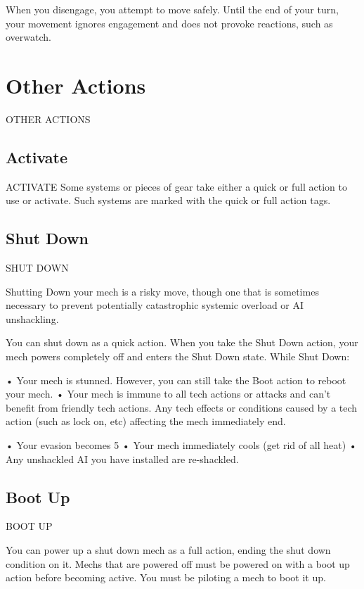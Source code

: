 When you disengage, you attempt to move safely. Until the end of your turn, your movement  
ignores engagement and does not provoke reactions, such as overwatch.
 
\section{Other Actions} OTHER ACTIONS  
\subsection{Activate}
                                             ACTIVATE  
Some systems or pieces of gear take either a quick or full action to use or activate. Such  
systems are marked with the quick or full action tags.
 
\subsection{Shut Down}
                                           SHUT DOWN  

Shutting Down your mech is a risky move, though one that is sometimes necessary to prevent  
potentially catastrophic systemic overload or AI unshackling.   

You can shut down as a quick action. When you take the Shut Down action, your mech powers  
completely off and enters the Shut Down state. While Shut Down:
 
       •  Your mech is stunned. However, you can still take the Boot action to reboot your mech.  
       •  Your mech is immune to all tech actions or attacks and can’t benefit from friendly tech  
         actions. Any tech effects or conditions caused by a tech action (such as lock on, etc)  
         affecting the mech immediately end.
 
       •  Your evasion becomes 5  
       •  Your mech immediately cools (get rid of all heat)  
       • Any unshackled AI you have installed are re-shackled.  
\subsection{Boot Up}
                                              BOOT UP
 
You can power up a shut down mech as a full action, ending the shut down condition on it.  
Mechs that are powered off must be powered on with a boot up action before becoming active.  
You must be piloting a mech to boot it up.
 

